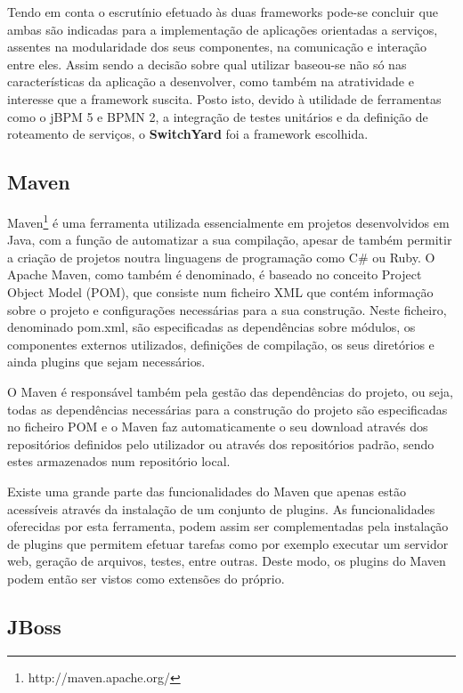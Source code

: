 Tendo em conta o escrutínio efetuado às duas frameworks pode-se concluir que ambas são indicadas para a implementação de aplicações orientadas a serviços, assentes na modularidade dos seus componentes, na comunicação e interação entre eles. Assim sendo a decisão sobre qual utilizar baseou-se não só nas características da aplicação a desenvolver, como também na atratividade e interesse que a framework suscita. Posto isto, devido à utilidade de ferramentas como o jBPM 5 e BPMN 2, a integração de testes unitários e da definição de roteamento de serviços, o \textbf{SwitchYard} foi a framework escolhida.


\subsection{Maven}

Maven\footnote{http://maven.apache.org/} é uma ferramenta utilizada essencialmente em projetos desenvolvidos em Java, com a função de automatizar a sua compilação, apesar de também permitir a criação de projetos noutra linguagens de programação como C\# ou Ruby. O Apache Maven, como também é denominado, é baseado no conceito Project Object Model (POM), que consiste num ficheiro XML que contém informação sobre o projeto e configurações necessárias para a sua construção. Neste ficheiro, denominado pom.xml, são especificadas as dependências sobre módulos, os componentes externos utilizados, definições de compilação, os seus diretórios e ainda plugins que sejam necessários.

O Maven é responsável também pela gestão das dependências do projeto, ou seja, todas as dependências necessárias para a construção do projeto são especificadas no ficheiro POM e o Maven faz automaticamente o seu download através dos repositórios definidos pelo utilizador ou através dos repositórios padrão, sendo estes armazenados num repositório local.

Existe uma grande parte das funcionalidades do Maven que apenas estão acessíveis através da instalação de um conjunto de plugins. As funcionalidades oferecidas por esta ferramenta, podem assim ser complementadas pela instalação de plugins que permitem efetuar tarefas como por exemplo executar um servidor web, geração de arquivos, testes, entre outras. Deste modo, os plugins do Maven podem então ser vistos como extensões do próprio.

\subsection{JBoss}

